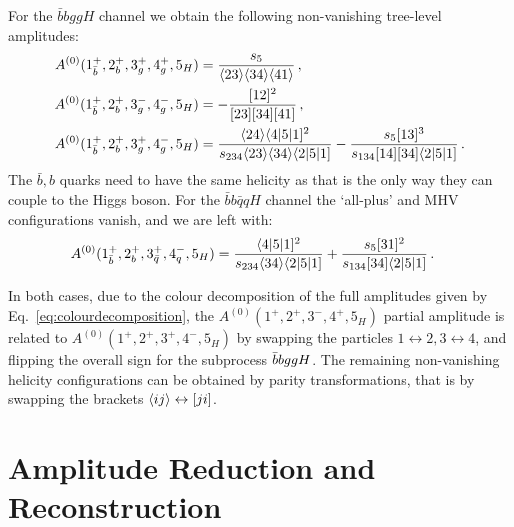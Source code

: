 \documentclass[main.tex]{subfiles}
\begin{document}
For the $\bar{b} b g g H$ channel we obtain the following non-vanishing tree-level amplitudes:
\begin{align} \label{eq:A0bbggh}
	A^{(0)}(1^+_{\bar{b}},2^+_{b},3^+_g,4^+_g,5_{H}) &=  \frac{s_5}{\langle23\rangle \langle34\rangle \langle41\rangle} \,, \nonumber \\
	A^{(0)}(1^+_{\bar{b}},2^+_{b},3^-_g,4^-_g,5_{H}) &= -\frac{[12]^2}{[23][34][41]} \,, \\
	A^{(0)}(1^+_{\bar{b}},2^+_{b},3^+_g,4^-_g,5_{H}) &= \frac{\langle24\rangle \langle4|5|1]^2}{s_{234} \langle23\rangle \langle34\rangle \langle2|5|1]}-\frac{s_5 [13]^3}{s_{134} [14] [34] \langle2|5|1]} \,. \nonumber
\end{align}
The $\bar{b},b$ quarks need to have the same helicity as that is the only way they can couple to the Higgs boson. 
For the $\bar{b} b \bar{q} q H$ channel the `all-plus' and MHV configurations vanish, and we are left with:
\begin{align} \label{eq:A0bbqqh}
	A^{(0)}(1^+_{\bar b},2^+_{b},3^+_{\bar q},4^-_{q},5_{H}) &=  \frac{\langle4|5|1]^2}{s_{234} \langle34\rangle \langle2|5|1]}+\frac{s_5 [31]^2}{s_{134} [34] \langle2|5|1]} \,. 
\end{align}

In both cases, due to the colour decomposition of the full amplitudes given by Eq.~\ref{eq:colourdecomposition}, the $A^{(0)}(1^+,2^+,3^-,4^+,5_{H})$ partial amplitude is related to $A^{(0)}(1^+,2^+,3^+,4^-,5_{H})$ by swapping the particles $1\leftrightarrow 2,3\leftrightarrow 4$, and flipping the overall sign for the subprocess $\bar{b}bggH$. The remaining non-vanishing helicity configurations can be obtained by parity transformations, that is by swapping the brackets $\langle ij \rangle \leftrightarrow [ji]$.

\section{Amplitude Reduction and Reconstruction}
\label{Hbbsec:reduction}
\end{document}
